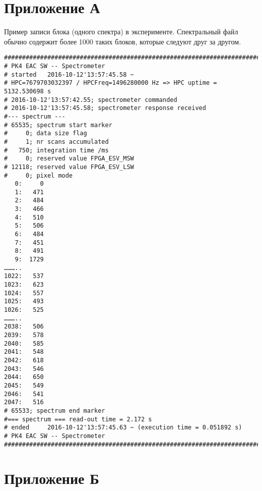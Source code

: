 \App
\label{app}

\section{Приложение А}
\label{app:app1}
Пример записи блока (одного спектра) в эксперименте. Спектральный файл обычно содержит более 1000 таких блоков, которые
следуют друг за другом.

\begin{small}
\begin{verbatim}
###############################################################################
# PK4 EAC SW -- Spectrometer
# started   2016-10-12'13:57:45.58 ~
# HPC=7679703032397 / HPCFreq=1496280000 Hz => HPC uptime = 5132.530698 s
# 2016-10-12'13:57:42.55; spectrometer commanded
# 2016-10-12'13:57:45.58; spectrometer response received
#--- spectrum ---
# 65535; spectrum start marker
#     0; data size flag
#     1; nr scans accumulated
#   750; integration time /ms
#     0; reserved value FPGA_ESV_MSW
# 12118; reserved value FPGA_ESV_LSW
#     0; pixel mode
   0:     0
   1:   471
   2:   484
   3:   466
   4:   510
   5:   506
   6:   484
   7:   451
   8:   491
   9:  1729
………..
1022:   537
1023:   623
1024:   557
1025:   493
1026:   525
………..
2038:   506
2039:   578
2040:   585
2041:   548
2042:   618
2043:   546
2044:   650
2045:   549
2046:   541
2047:   516
# 65533; spectrum end marker
#=== spectrum === read-out time = 2.172 s
# ended     2016-10-12'13:57:45.63 ~ (execution time = 0.051892 s)
# PK4 EAC SW -- Spectrometer
###############################################################################
\end{verbatim}
\end{small}

\section{Приложение Б}
\label{app:app2}